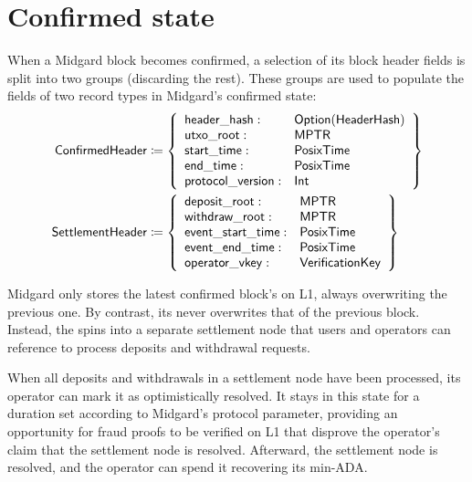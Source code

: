 \documentclass[../midgard.tex]{subfiles}
\begin{document}
\section{Confirmed state}
\label{h:confirmed-state}

\todo

When a Midgard block becomes confirmed, a selection of its block header fields is split into two groups (discarding the rest).
These groups are used to populate the fields of two record types in Midgard's confirmed state:
\begingroup
\allowdisplaybreaks
\begin{align*}
    \mathsf{ConfirmedHeader} &\coloneq \left\{
    \begin{array}{ll}
        \mathsf{header\_hash} : & \mathsf{Option(HeaderHash)} \\
        \mathsf{utxo\_root} : & \mathsf{MPTR} \\
        \mathsf{start\_time} : & \mathsf{PosixTime} \\
        \mathsf{end\_time} : & \mathsf{PosixTime} \\
        \mathsf{protocol\_version} : & \mathsf{Int} \\
    \end{array} \right\} \\
    \mathsf{SettlementHeader} &\coloneq \left\{
    \begin{array}{ll}
        \mathsf{deposit\_root} : & \mathsf{MPTR} \\
        \mathsf{withdraw\_root} : & \mathsf{MPTR} \\
        \mathsf{event\_start\_time}: & \mathsf{PosixTime} \\
        \mathsf{event\_end\_time}: & \mathsf{PosixTime} \\
        \mathsf{operator\_vkey} : & \mathsf{VerificationKey}
    \end{array} \right\}
\end{align*}
\endgroup

Midgard only stores the latest confirmed block's  on L1, always overwriting the previous one.
By contrast, its  never overwrites that of the previous block.
Instead, the  spins into a separate settlement node that users and operators can reference to process deposits and withdrawal requests.

When all deposits and withdrawals in a settlement node have been processed, its operator can mark it as optimistically resolved.
It stays in this state for a duration set according to Midgard's  protocol parameter, providing an opportunity for fraud proofs to be verified on L1 that disprove the operator's claim that the settlement node is resolved.
Afterward, the settlement node is resolved, and the operator can spend it recovering its min-ADA.
\end{document}
